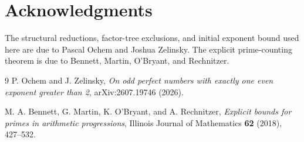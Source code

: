 \documentclass[11pt]{article}
\begin{document}
\section*{Acknowledgments}
The structural reductions, factor-tree exclusions, and initial exponent bound used here are due to Pascal Ochem and Joshua Zelinsky. The explicit prime-counting theorem is due to Bennett, Martin, O'Bryant, and Rechnitzer.

\begin{thebibliography}{9}
P. Ochem and J. Zelinsky,
\emph{On odd perfect numbers with exactly one even exponent greater than 2},
arXiv:2607.19746 (2026).

M. A. Bennett, G. Martin, K. O'Bryant, and A. Rechnitzer,
\emph{Explicit bounds for primes in arithmetic progressions},
Illinois Journal of Mathematics \textbf{62} (2018), 427--532.
\end{thebibliography}
\end{document}
